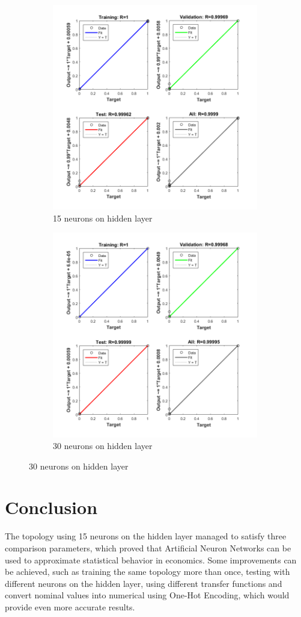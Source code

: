\documentclass[12pt]{article}
\begin{document}
\begin{figure}[H]
	\begin{subfigure}{9cm}
	\centering\includegraphics[width=9cm]{images/regression15_1.png}
	\caption{15 neurons on hidden layer}
	\end{subfigure}%
	\begin{subfigure}{9cm}
	\centering\includegraphics[width=9cm]{images/regression30_1.png}
	\caption{30 neurons on hidden layer}
	\end{subfigure}
	\end{figure}

\newpage
\section{Conclusion}
	The topology using 15 neurons on the hidden layer managed to satisfy three comparison parameters, which proved that Artificial Neuron Networks can be used to approximate statistical behavior in economics. 
	Some improvements can be achieved, such as training the same topology more than once, testing with different neurons on the hidden layer, using different transfer functions and convert nominal values into numerical using One-Hot Encoding, which would provide even more accurate results.




\end{document}
